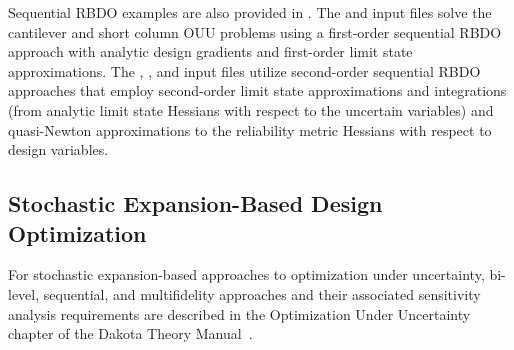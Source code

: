 Sequential RBDO examples are also provided in
.  The
 and
 input files solve the
cantilever and short column OUU problems using a first-order
sequential RBDO approach with analytic design gradients and
first-order limit state approximations. The
,
, and
 input files utilize
second-order sequential RBDO approaches that employ second-order limit
state approximations and integrations (from analytic limit state
Hessians with respect to the uncertain variables) and quasi-Newton
approximations to the reliability metric Hessians with respect to
design variables.

\subsection{Stochastic Expansion-Based Design Optimization} \label{adv_models:ouu:sebdo}

For stochastic expansion-based approaches to optimization under
uncertainty, bi-level, sequential, and multifidelity approaches and
their associated sensitivity analysis requirements are described in
the Optimization Under Uncertainty chapter of the Dakota Theory
Manual~\cite{TheoMan}.

